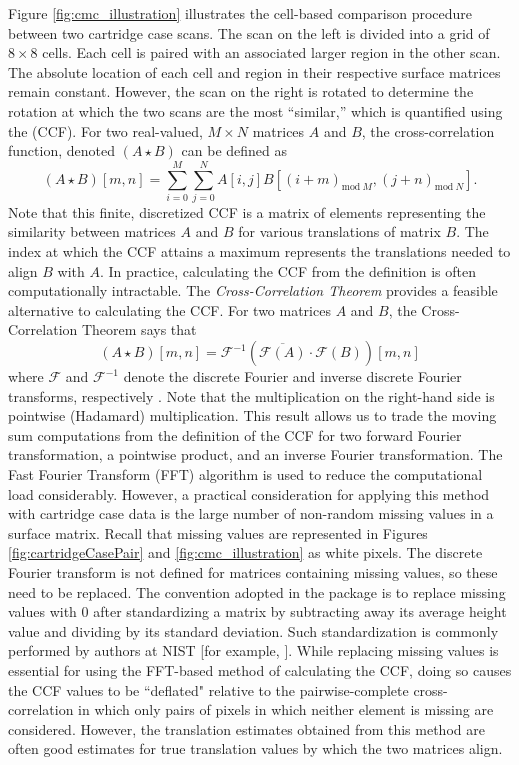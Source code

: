 Figure \ref{fig:cmc_illustration} illustrates the cell-based comparison
procedure between two cartridge case scans. The scan on the left is
divided into a grid of \(8 \times 8\) cells. Each cell is paired with an
associated larger region in the other scan. The absolute location of
each cell and region in their respective surface matrices remain
constant. However, the scan on the right is rotated to determine the
rotation at which the two scans are the most ``similar,'' which is
quantified using the  (CCF). For two
real-valued, \(M \times N\) matrices \(A\) and \(B\), the
cross-correlation function, denoted \((A \star B)\) can be defined as \[
(A \star B)[m,n] = \sum_{i=0}^M \sum_{j=0}^N A[i,j] B[(i + m)_{\text{mod}\ M}, (j + n)_{\text{mod}\ N}].
\] Note that this finite, discretized CCF is a matrix of elements
representing the similarity between matrices \(A\) and \(B\) for various
translations of matrix \(B\). The index at which the CCF attains a
maximum represents the translations needed to align \(B\) with \(A\). In
practice, calculating the CCF from the definition is often
computationally intractable. The \emph{Cross-Correlation Theorem}
provides a feasible alternative to calculating the CCF. For two matrices
\(A\) and \(B\), the Cross-Correlation Theorem says that \[
(A \star B )[m,n]= \mathcal{F}^{-1}\left(\overline{\mathcal{F}(A)} \cdot \mathcal{F}(B)\right)[m,n]
\] where \(\mathcal{F}\) and \(\mathcal{F}^{-1}\) denote the discrete
Fourier and inverse discrete Fourier transforms, respectively
\citep{fft_brigham}. Note that the multiplication on the right-hand side
is pointwise (Hadamard) multiplication. This result allows us to trade
the moving sum computations from the definition of the CCF for two
forward Fourier transformation, a pointwise product, and an inverse
Fourier transformation. The Fast Fourier Transform (FFT) algorithm is
used to reduce the computational load considerably. However, a practical
consideration for applying this method with cartridge case data is the
large number of non-random missing values in a surface matrix. Recall
that missing values are represented in Figures
\ref{fig:cartridgeCasePair} and \ref{fig:cmc_illustration} as white
pixels. The discrete Fourier transform is not defined for matrices
containing missing values, so these need to be replaced. The convention
adopted in the  package is to replace missing values with 0
after standardizing a matrix by subtracting away its average height
value and dividing by its standard deviation. Such standardization is
commonly performed by authors at NIST {[}for example,
\citep{ott_applying_2017}{]}. While replacing missing values is
essential for using the FFT-based method of calculating the CCF, doing
so causes the CCF values to be ``deflated" relative to the
pairwise-complete cross-correlation in which only pairs of pixels in
which neither element is missing are considered. However, the
translation estimates obtained from this method are often good estimates
for true translation values by which the two matrices align.

